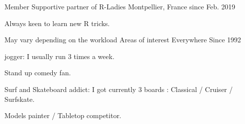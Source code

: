 

\begin{cventries}

%
  \cventry
    {Member} %
    {Supportive partner of R-Ladies} %
    {Montpellier, France} %
    {since Feb. 2019} %
    {
      \begin{cvitems} %
        \item {Always keen to learn new R tricks.}
      \end{cvitems}
    }
    
  \cventry
    {May vary depending on the workload} %
    {Areas of interest} %
    {Everywhere} %
    {Since 1992} %
    {
      \begin{cvitems} %
        \item {jogger: I usually run 3 times a week.}
        \item {Stand up comedy fan.}
        \item {Surf and Skateboard addict: I got currently 3 boards : Classical / Cruiser / Surfskate.}
        \item {Models painter / Tabletop competitor.}
      \end{cvitems}
    }

\end{cventries}
